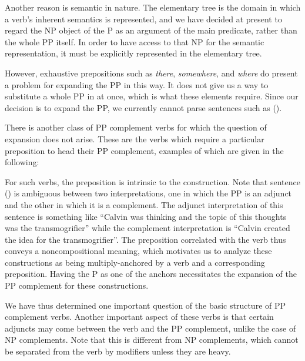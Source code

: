 Another reason is semantic in nature.  The elementary tree is the
domain in which a verb's inherent semantics is represented, and we
have decided at present to regard the NP object of the P as an
argument of the main predicate, rather than the whole PP itself.  In
order to have access to that NP for the semantic representation, it
must be explicitly represented in the elementary tree.

However, exhaustive prepositions such as {\it there}, {\it somewhere},
and {\it where} do present a problem for expanding the PP in this way.
It does not give us a way to substitute a whole PP in at once, which
is what these elements require.  Since our decision is to expand the
PP, we currently cannot parse sentences such as ().


There is another class of PP complement verbs for which the question
of expansion does not arise.  These are the verbs which require a
particular preposition to head their PP complement, examples of which
are given in the following:



For such verbs, the preposition is intrinsic to the construction.
Note that sentence () is ambiguous between two interpretations,
one in which the PP is an adjunct and the other in which it is a
complement.  The adjunct interpretation of this sentence is something
like ``Calvin was thinking and the topic of this thoughts was the
transmogrifier'' while the complement interpretation is ``Calvin
created the idea for the transmogrifier''.  The preposition correlated
with the verb thus conveys a noncompositional meaning, which motivates
us to analyze these constructions as being multiply-anchored by a verb
and a corresponding preposition.  Having the P as one of the anchors
necessitates the expansion of the PP complement for these
constructions.

We have thus determined one important question of the basic structure
of PP complement verbs.  Another important aspect of these verbs is
that certain adjuncts may come between the verb and the PP complement,
unlike the case of NP complements.  Note that this is different from
NP complements, which cannot be separated from the verb by modifiers
unless they are heavy.

